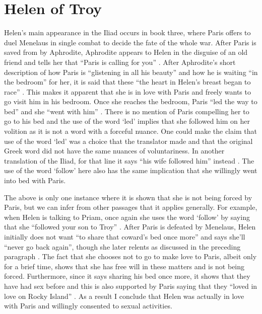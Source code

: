 \documentclass[11pt]{article}
\begin{document}
\section{Helen of Troy}

Helen's main appearance in the Iliad occurs in book three, where Paris offers to duel Menelaus in single combat to decide the fate of the whole war.
After Paris is saved from by Aphrodite, Aphrodite appears to Helen in the disguise of an old friend and tells her that ``Paris is calling for you'' \cite[book 3, line 450]{iliad}.
After Aphrodite's short description of how Paris is ``glistening in all his beauty'' and how he is waiting ``in the bedroom'' for her, it is said that these ``the heart in Helen's breast began to race'' \cite[book 3, line 456]{iliad}.
This makes it apparent that she is in love with Paris and freely wants to go visit him in his bedroom.
Once she reaches the bedroom, Paris ``led the way to bed'' and she ``went with him'' \cite[book 3, line 525]{iliad}.
There is no mention of Paris compelling her to go to his bed and the use of the word `led' implies that she followed him on her volition as it is not a word with a forceful nuance.
One could make the claim that use of the word `led' was a choice that the translator made and that the original Greek word did not have the same nuances of voluntariness.
In another translation of the Iliad, for that line it says ``his wife followed him'' instead \cite[book 3, line 448]{iliad-rieu}.
The use of the word `follow' here also has the same implication that she willingly went into bed with Paris.

The above is only one instance where it is shown that she is not being forced by Paris, but we can infer from other passages that it applies generally.
For example, when Helen is talking to Priam, once again she uses the word `follow' by saying that she ``followed your son to Troy'' \cite[book 3, line 210]{iliad}.
After Paris is defeated by Menelaus, Helen initially does not want ``to share that coward's bed once more'' and says she'll ``never go back  again'', though she later relents as discussed in the preceding paragraph \cite[book 3, line 475]{iliad}.
The fact that she chooses not to go to make love to Paris, albeit only for a brief time, shows that she has free will in these matters and is not being forced.
Furthermore, since it says sharing his bed once more, it shows that they have had sex before and this is also supported by Paris saying that they ``loved in love on Rocky Island'' \cite[book 3, line 522]{iliad}.
As a result I conclude that Helen was actually in love with Paris and willingly consented to sexual activities.
\end{document}
